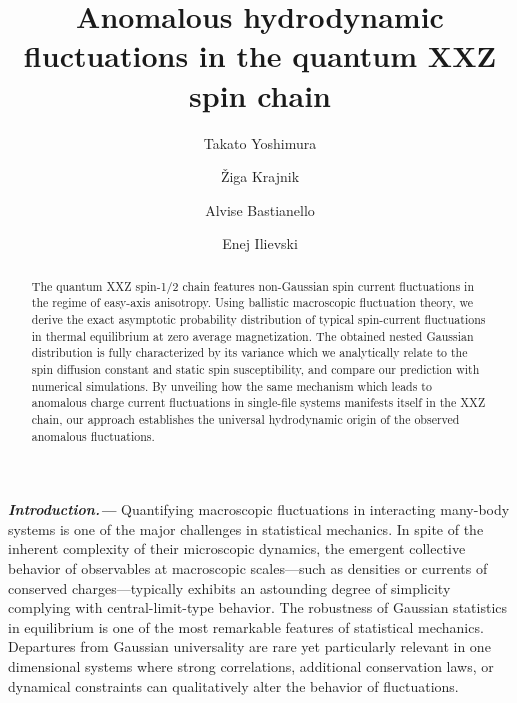 \documentclass[
twocolumn,
amsfonts,
showpacs,
superscriptaddress,
amsmath,
amssymb,
aps,
longbibliography,
prl,
noeprint
]{revtex4-2}
\newcommand{\ch}[1]{{\color{black}  #1}}
\newcommand{\para}[1]{ \noindent\emph{\textbf{#1---}}}
\newcounter{ls}
\newcommand{\1}{{\bf 1}}
\begin{document}
\title{Anomalous hydrodynamic fluctuations in the quantum XXZ spin chain}
\author{Takato Yoshimura}

\author{\v{Z}iga Krajnik}
\author{Alvise Bastianello}
\author{Enej Ilievski}

\begin{abstract}
{The quantum XXZ spin-1/2 chain features non-Gaussian spin current fluctuations in the regime of easy-axis anisotropy.
Using ballistic macroscopic fluctuation theory, we derive the exact \ch{asymptotic} probability distribution of typical spin-current fluctuations in thermal equilibrium \ch{at zero average magnetization}. The obtained nested Gaussian distribution is fully characterized by its variance which we analytically relate to the spin diffusion constant and static spin susceptibility, and compare our prediction with numerical simulations.
By unveiling how the same mechanism which leads to anomalous charge current fluctuations in single-file systems manifests itself in the XXZ chain, our approach establishes the universal hydrodynamic origin of the observed anomalous fluctuations.}
\end{abstract}


\maketitle

\para{Introduction.} Quantifying macroscopic fluctuations in interacting many-body systems is one of the major challenges in statistical mechanics. In spite of the inherent complexity of their microscopic dynamics, the emergent collective behavior of observables at macroscopic scales---such as densities or currents of conserved charges---typically exhibits an astounding degree of simplicity complying with central-limit-type behavior. The robustness of Gaussian statistics in equilibrium is one of the most remarkable features of statistical mechanics. Departures from Gaussian universality are rare yet particularly relevant in one dimensional systems where strong correlations, additional conservation laws, or dynamical constraints can qualitatively alter the behavior of fluctuations.
\end{document}
